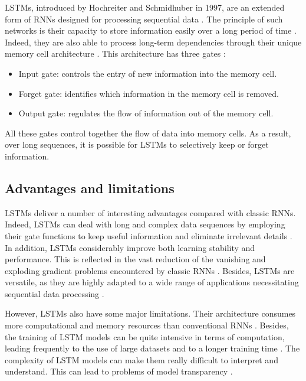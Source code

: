 \documentclass[12pt,oneside]{book} %
\begin{document}
\noindent LSTMs, introduced by Hochreiter and Schmidhuber in 1997, are an extended form of RNNs designed for processing sequential data \citep{LSTM1,LSTM2}. The principle of such networks is their capacity to store information easily over a long period of time \cite{LSTM1}. Indeed, they are also able to process long-term dependencies through their unique memory cell architecture \cite{LSTM1}. This architecture has three gates \citep{LSTM1,LSTM2}:
\begin{itemize}
    \item Input gate: controls the entry of new information into the memory cell.
    \item Forget gate: identifies which information in the memory cell is removed. 
    \item Output gate: regulates the flow of information out of the memory cell. 
\end{itemize}
 
\noindent All these gates control together the flow of data into memory cells. As a result, over long sequences, it is possible for LSTMs to selectively keep or forget information.

\subsection{Advantages and limitations}

\noindent LSTMs deliver a number of interesting advantages compared with classic RNNs. Indeed, LSTMs can deal with long and complex data sequences by employing their gate functions to keep useful information and eliminate irrelevant details \cite{LSTM3}. In addition, LSTMs considerably improve both learning stability and performance. This is reflected in the vast reduction of the vanishing and exploding gradient problems encountered by classic RNNs \cite{LSTM3}. Besides, LSTMs are versatile, as they are highly adapted to a wide range of applications necessitating sequential data processing .

\noindent However, LSTMs also have some major limitations. Their architecture consumes more computational and memory resources than conventional RNNs \cite{LSTM3}. Besides, the training of LSTM models can be quite intensive in terms of computation, leading frequently to the use of large datasets and to a longer training time \cite{LSTM3}. The complexity of LSTM models can make them really difficult to interpret and understand. This can lead to problems of model transparency \cite{LSTM3}.
\end{document}
